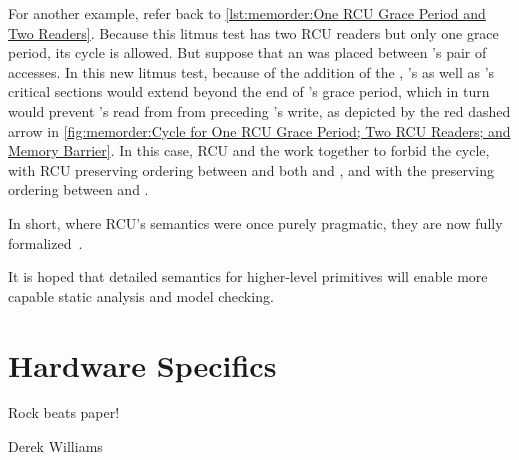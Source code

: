 For another example, refer back to
\cref{lst:memorder:One RCU Grace Period and Two Readers}.
Because this litmus test has two RCU readers but only one grace period,
its cycle is allowed.
But suppose that an  was placed between 's
pair of accesses.
In this new litmus test, because of the addition of the ,
's as well as 's critical sections would extend beyond the
end of 's grace period, which in turn would prevent 's
read from  from preceding 's write, as depicted by the
red dashed arrow in
\cref{fig:memorder:Cycle for One RCU Grace Period; Two RCU Readers; and Memory Barrier}.
In this case, RCU and the  work together to forbid
the cycle, with RCU preserving ordering between  and both
 and , and with the  preserving
ordering between  and .

\QuickQuizEnd

In short, where RCU's semantics were once purely pragmatic, they are
now fully
formalized~\cite{PaulMcKenney2005RCUSemantics,MathieuDesnoyers2012URCU,AlexeyGotsman2013ESOPRCU,Alglave:2018:FSC:3173162.3177156}.




It is hoped that detailed semantics for higher-level primitives will
enable more capable static analysis and model checking.

\section{Hardware Specifics}
\label{sec:memorder:Hardware Specifics}
%
\epigraph{Rock beats paper!}{Derek Williams}

